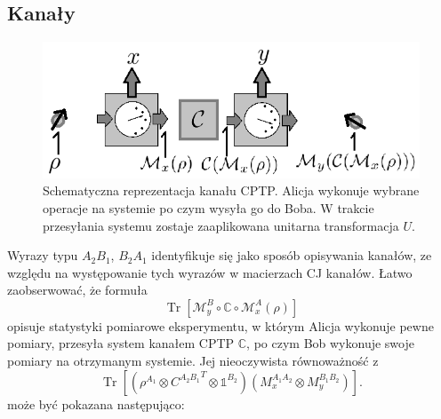 \documentclass[10pt]{article} %
\DeclareMathOperator{\Trs}{Tr}
\newcommand{\I}{\mathbb{1}}
\begin{document}
\subsection{Kanały}
\begin{figure}[h]
\centering
\includegraphics{obrazki/channel_new}
\caption{Schematyczna reprezentacja kanału CPTP. Alicja wykonuje wybrane operacje na systemie po czym wysyła go do Boba. W trakcie przesyłania systemu zostaje zaaplikowana unitarna transformacja $U$.}
\end{figure}
Wyrazy typu $A_2B_1$, $B_2A_1$ identyfikuje się jako sposób opisywania kanałów, ze względu na występowanie tych wyrazów w macierzach CJ kanałów.
Łatwo zaobserwować, że formuła
\begin{equation}
\Trs \left[ \mathcal{M}_y^B \circ \mathds{C} \circ \mathcal{M}_x^A(\rho)\right]
\end{equation} opisuje statystyki pomiarowe eksperymentu, w którym Alicja wykonuje pewne pomiary, przesyła system kanałem CPTP $\mathds{C}$, po czym Bob wykonuje swoje pomiary na otrzymanym systemie. Jej nieoczywista równoważność z 
\begin{equation}
\Trs \left[\left( \rho^{A_1}\otimes  {C^{A_2B_1}}^T \otimes \I^{B_2}\right)(M_x^{A_1A_2}\otimes M_y^{B_1B_2})\right].
\end{equation} może być pokazana następująco: 
\end{document}
